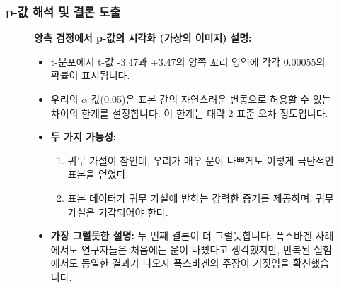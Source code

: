 \documentclass[11pt,a4paper]{book}
\providecommand{\captionof}[2]{\textbf{#2}}
\theoremstyle{definition}
\begin{document}
\subsubsection*{p-값 해석 및 결론 도출}

\begin{figure}[h!]
    \centering
    \captionof{figure}{양측 검정에서 p-값의 시각화 (가상의 이미지)}
    \label{fig:p_value_interpretation}
    \vspace{0.5em}
    \textbf{설명:}
    \begin{itemize}
        \item t-분포에서 t-값 -3.47과 +3.47의 양쪽 꼬리 영역에 각각 0.00055의 확률이 표시됩니다.
        \item 우리의 $\alpha$ 값(0.05)은 표본 간의 자연스러운 변동으로 허용할 수 있는 차이의 한계를 설정합니다. 이 한계는 대략 2 표준 오차 정도입니다.
        \item \textbf{두 가지 가능성:}
            \begin{enumerate}
                \item 귀무 가설이 참인데, 우리가 매우 운이 나쁘게도 이렇게 극단적인 표본을 얻었다.
                \item 표본 데이터가 귀무 가설에 반하는 강력한 증거를 제공하며, 귀무 가설은 기각되어야 한다.
            \end{enumerate}
        \item \textbf{가장 그럴듯한 설명:} 두 번째 결론이 더 그럴듯합니다. 폭스바겐 사례에서도 연구자들은 처음에는 운이 나빴다고 생각했지만, 반복된 실험에서도 동일한 결과가 나오자 폭스바겐의 주장이 거짓임을 확신했습니다.
    \end{itemize}
\end{figure}
\end{document}
